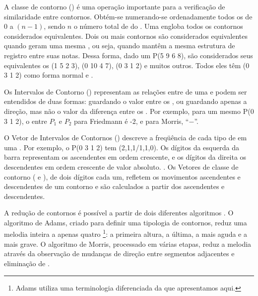 A classe de contorno () é uma operação importante para a
verificação de similaridade entre contornos. Obtém-se 
numerando-se ordenadamente todos os  de $0$ a $(n-1)$,
sendo $n$ o número total de  do . Uma 
engloba todos os contornos considerados equivalentes. Dois ou mais
contornos são considerados equivalentes quando geram uma mesma
, ou seja, quando mantêm a mesma estrutura de registro
entre suas notas. Dessa forma, dado um  P(5 9 6 8), são
considerados seus equivalentes os  (1 5 2 3), (0 10 4 7), (0
3 1 2) e muitos outros. Todos eles têm (0 3 1 2) como forma normal e
.

Os Intervalos de Contorno () representam as relações entre
 de uma  e podem ser entendidos de duas formas:
guardando o valor entre os 
\cite{friedmann85:methodology}, ou guardando apenas a direção, mas não
o valor da diferença entre os 
\cite{morris93:directions}. Por exemplo, para um mesmo 
P(0 3 1 2), o  entre $P_1$ e $P_2$ para
Friedmann é -2, e para Morris, ``$-$''.

O Vetor de Intervalos de Contornos () descreve a freqüência de
cada tipo de  em uma . Por exemplo, o  P(0 3 1
2) tem  (2,1,1/1,1,0). Os dígitos da esquerda da barra
representam os  ascendentes em ordem crescente, e os dígitos da
direita os  descendentes em ordem crescente de valor
absoluto. \cite{friedmann85:methodology}. Os Vetores de classe de
contorno ( e ), de dois dígitos cada um, refletem
os movimentos ascendentes e descendentes de um contorno e são
calculados a partir dos  ascendentes e descendentes.

A redução de contornos é possível a partir de dois diferentes
algoritmos \cite{adams76:melodic,morris93:directions}. O algoritmo de
Adams, criado para definir uma tipologia de contornos, reduz uma
melodia inteira a apenas quatro \footnote{Adams utiliza
  uma terminologia diferenciada da que apresentamos aqui.}: a primeira
altura, a última, a mais aguda e a mais grave. O algoritmo de Morris,
processado em várias etapas, reduz a melodia através da observação de
mudanças de direção entre segmentos adjacentes e eliminação de
.


